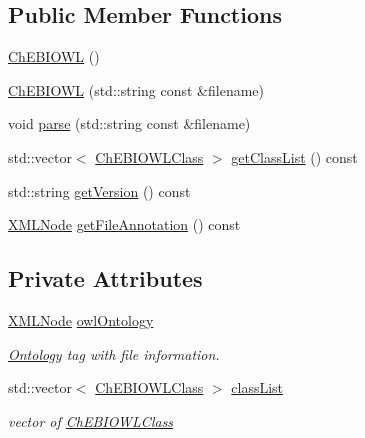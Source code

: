 \subsection*{Public Member Functions}
\begin{DoxyCompactItemize}
\item 
\hyperlink{classunisys_1_1ChEBIOWL_a27532c1116f67a40537697be2fd43677}{Ch\-E\-B\-I\-O\-W\-L} ()
\item 
\hyperlink{classunisys_1_1ChEBIOWL_aa1f70f82dbb1b9657e32d6864bfb5f97}{Ch\-E\-B\-I\-O\-W\-L} (std\-::string const \&filename)
\item 
void \hyperlink{classunisys_1_1ChEBIOWL_a83d26bbca0b2c067cbc27f919da5a6a7}{parse} (std\-::string const \&filename)
\item 
std\-::vector$<$ \hyperlink{classunisys_1_1ChEBIOWLClass}{Ch\-E\-B\-I\-O\-W\-L\-Class} $>$ \hyperlink{classunisys_1_1ChEBIOWL_abed6a43a962a98659d28fb9a46232254}{get\-Class\-List} () const 
\item 
std\-::string \hyperlink{classunisys_1_1ChEBIOWL_a381f8bd0263b190157dd586c481083d0}{get\-Version} () const 
\item 
\hyperlink{structXMLNode}{X\-M\-L\-Node} \hyperlink{classunisys_1_1ChEBIOWL_a59e06150bc5b433fdb14e55b1ca95e16}{get\-File\-Annotation} () const 
\end{DoxyCompactItemize}
\subsection*{Private Attributes}
\begin{DoxyCompactItemize}
\item 
\hyperlink{structXMLNode}{X\-M\-L\-Node} \hyperlink{classunisys_1_1ChEBIOWL_af8b35beb7f297b7314a82c011bbb5af8}{owl\-Ontology}
\begin{DoxyCompactList}\small\item\em \hyperlink{classunisys_1_1Ontology}{Ontology} tag with file information. \end{DoxyCompactList}\item 
std\-::vector$<$ \hyperlink{classunisys_1_1ChEBIOWLClass}{Ch\-E\-B\-I\-O\-W\-L\-Class} $>$ \hyperlink{classunisys_1_1ChEBIOWL_a86e75569a9a2110ca09bda3c9e2bcb37}{class\-List}
\begin{DoxyCompactList}\small\item\em vector of \hyperlink{classunisys_1_1ChEBIOWLClass}{Ch\-E\-B\-I\-O\-W\-L\-Class} \end{DoxyCompactList}\end{DoxyCompactItemize}


